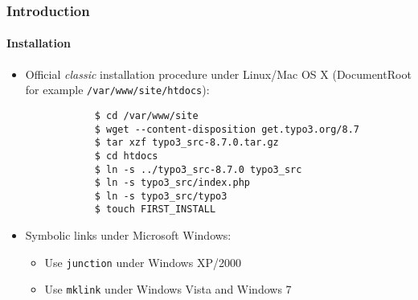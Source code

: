 \begin{frame}[fragile]
	\frametitle{Introduction}
	\framesubtitle{Installation}

	\begin{itemize}
		\item Official \textit{classic} installation procedure under Linux/Mac OS X\newline
			(DocumentRoot for example \texttt{/var/www/site/htdocs}):
		\begin{lstlisting}
			$ cd /var/www/site
			$ wget --content-disposition get.typo3.org/8.7
			$ tar xzf typo3_src-8.7.0.tar.gz
			$ cd htdocs
			$ ln -s ../typo3_src-8.7.0 typo3_src
			$ ln -s typo3_src/index.php
			$ ln -s typo3_src/typo3
			$ touch FIRST_INSTALL
		\end{lstlisting}

		\item Symbolic links under Microsoft Windows:

			\begin{itemize}
				\item Use \texttt{junction} under Windows XP/2000
				\item Use \texttt{mklink} under Windows Vista and Windows 7
			\end{itemize}

	\end{itemize}
\end{frame}

